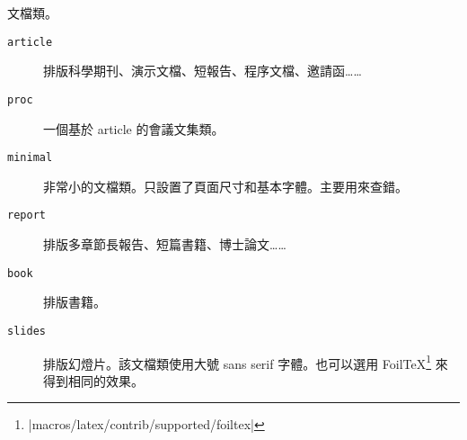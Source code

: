 \begin{table}[!bp]
\caption{文檔類。} \label{documentclasses}
\begin{lined}{\textwidth}
\begin{description}

\item [\normalfont\texttt{article}] 排版科學期刊、演示文檔、短報告、程序文檔、邀請函……
\item [\normalfont\texttt{proc}] 一個基於 article 的會議文集類。
\item [\normalfont\texttt{minimal}] 非常小的文檔類。只設置了頁面尺寸和基本字體。主要用來查錯。
\item [\normalfont\texttt{report}] 排版多章節長報告、短篇書籍、博士論文……
\item [\normalfont\texttt{book}] 排版書籍。
\item [\normalfont\texttt{slides}] 排版幻燈片。該文檔類使用大號 sans
serif 字體。也可以選用 Foil\TeX{}\footnote{%
        \CTANref|macros/latex/contrib/supported/foiltex|} 來得到相同的效果。
\end{description}
\end{lined}
\end{table}

